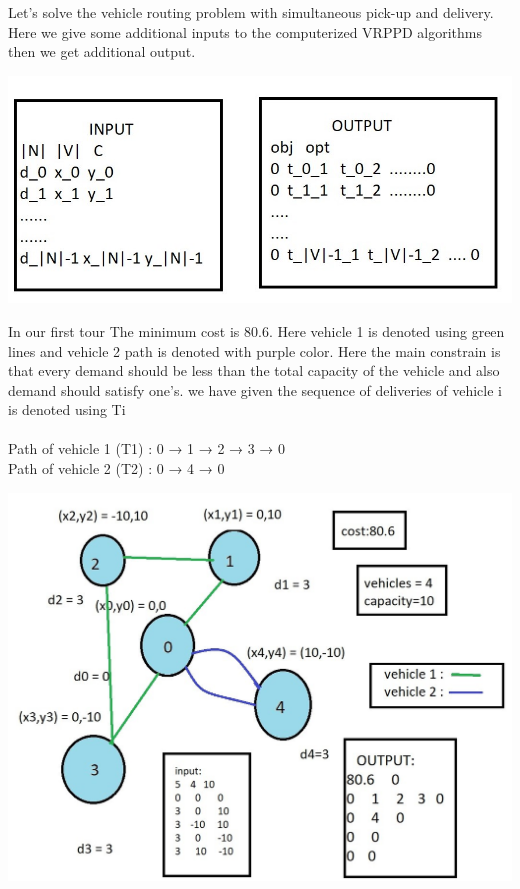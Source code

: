 \documentclass[conference]{IEEEtran}
\begin{document}
Let’s solve the vehicle routing problem with simultaneous pick-up and delivery. Here we give some additional  inputs to the computerized VRPPD algorithms  then we get additional output.

\includegraphics[width=1\linewidth]{
opti_2.jpg}\par  


In our first tour The minimum cost is 80.6. Here vehicle 1 is denoted using green  lines and vehicle 2  path is denoted with purple color. Here the main constrain is that every demand should be less than the total capacity of the vehicle and also demand should satisfy one's. we have given the sequence of deliveries of vehicle i is denoted  using Ti\\
\\
Path of vehicle 1 (T1) : 0 → 1 → 2 → 3 → 0 \\
Path of vehicle 2 (T2) : 0 → 4 → 0 \\

\begin{center}
\includegraphics[width=1\linewidth]{
opti_3.jpg}\par  
\end{center}
\vspace{5}
\end{document}
